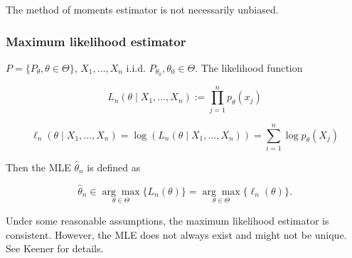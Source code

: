 \begin{remark}The method of moments estimator is not necessarily unbiased.

\end{remark}

\subsubsection{Maximum likelihood estimator}\label{mathstats.sec.mle}

\begin{definition}

\(P = \{P_\theta, \theta \in \Theta\}\), \(X_1, \ldots, X_n\) i.i.d. \(P_{\theta_0}, \theta_0 \in \Theta\). The likelihood function 

\[
L_n (\theta \mid X_1, \ldots, X_n) := \prod_{j=1}^n p_\theta(x_j)
\]

\[
\ell_n (\theta \mid X_1, \ldots, X_n) = \log \left( L_n (\theta \mid X_1, \ldots, X_n) \right) = \sum_{i=1}^n \log p_\theta(X_j)
\]

Then the MLE \(\hat{\theta}_n\) is defined as 

\[
\hat{\theta}_n \in \underset{\theta \in \Theta}{\arg \max} \{ L_n(\theta) \} = \underset{\theta \in \Theta}{\arg \max} \{ \ell_n(\theta) \} .
\]

\end{definition}


\begin{remark}Under some reasonable assumptions, the maximum likelihood estimator is consistent. However, the MLE does not always exist and might not be unique. See Keener for details.

\end{remark}

